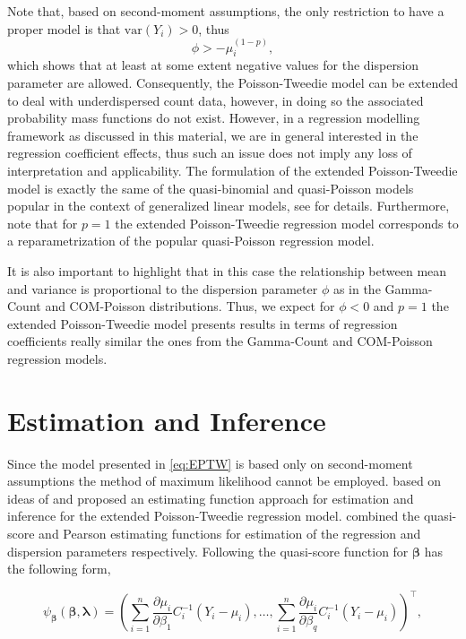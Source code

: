 \documentclass[9pt,a5paper,]{book}
\theoremstyle{definition}
\theoremstyle{definition}
\theoremstyle{remark}
\begin{document}
Note that, based on second-moment assumptions, the only restriction to
have a proper model is that \(\mathrm{var}(Y_i) > 0\), thus
\[\phi > - \mu^{(1-p)}_i,\] which shows that at least at some extent
negative values for the dispersion parameter are allowed. Consequently,
the Poisson-Tweedie model can be extended to deal with underdispersed
count data, however, in doing so the associated probability mass
functions do not exist. However, in a regression modelling framework as
discussed in this material, we are in general interested in the
regression coefficient effects, thus such an issue does not imply any
loss of interpretation and applicability. The formulation of the
extended Poisson-Tweedie model is exactly the same of the quasi-binomial
and quasi-Poisson models popular in the context of generalized linear
models, see \citep[\citet{Nelder1972}]{Wedderburn1974} for details.
Furthermore, note that for \(p = 1\) the extended Poisson-Tweedie
regression model corresponds to a reparametrization of the popular
quasi-Poisson regression model.

It is also important to highlight that in this case the relationship
between mean and variance is proportional to the dispersion parameter
\(\phi\) as in the Gamma-Count and COM-Poisson distributions. Thus, we
expect for \(\phi < 0\) and \(p = 1\) the extended Poisson-Tweedie model
presents results in terms of regression coefficients really similar the
ones from the Gamma-Count and COM-Poisson regression models.

\section{Estimation and Inference}\label{estimation-and-inference}

Since the model presented in \eqref{eq:EPTW} is based only on
second-moment assumptions the method of maximum likelihood cannot be
employed. \citet{Bonat2016b} based on ideas of \citet{Jorgensen2004} and
\citet{Bonat2016a} proposed an estimating function approach for
estimation and inference for the extended Poisson-Tweedie regression
model. \citet{Bonat2016b} combined the quasi-score and Pearson
estimating functions for estimation of the regression and dispersion
parameters respectively. Following \citet{Bonat2016b} the quasi-score
function for \(\boldsymbol{\beta}\) has the following form,

\begin{equation*}
\psi_{\boldsymbol{\beta}}(\boldsymbol{\beta}, \boldsymbol{\lambda}) = \left (\sum_{i=1}^n \frac{\partial \mu_i}{\partial \beta_1}C^{-1}_i(Y_i - \mu_i), \ldots, \sum_{i=1}^n \frac{\partial \mu_i}{\partial \beta_q}C^{-1}_i(Y_i - \mu_i)  \right )^\top,
\end{equation*}
\end{document}
